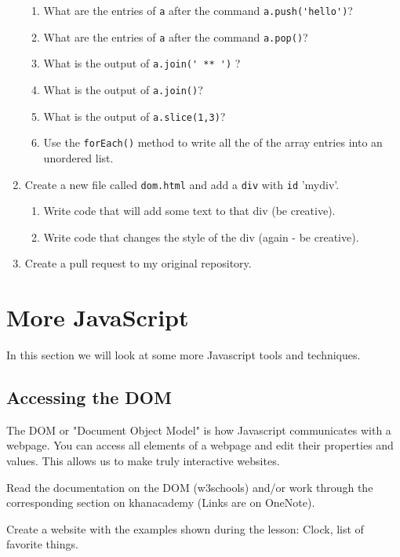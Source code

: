 \documentclass[english,11pt,a4paper]{report}
\begin{document}
\begin{ex}
\begin{enumerate}
\begin{enumerate}
\item What are the entries of \verb|a| after the command \verb|a.push('hello')|?
\item What are the entries of \verb|a| after the command \verb|a.pop()|?
\item What is the output of \verb|a.join(' ** ')| ?
\item What is the output of \verb|a.join()|?
\item What is the output of \verb|a.slice(1,3)|?
\item Use the \verb|forEach()| method to write all the of the array entries into an unordered list.
\end{enumerate}
\item Create a new file called \verb|dom.html| and add a \verb|div| with \verb|id| 'mydiv'.
\begin{enumerate}
\item Write code that will add some text to that div (be creative).
\item Write code that changes the style of the div (again - be creative).
\end{enumerate}
\item Create a pull request to my original repository.
\end{enumerate}
\end{ex}

\newpage


\section{More JavaScript}
In this section we will look at some more Javascript tools and techniques.

\subsection{Accessing the DOM}

The DOM or "Document Object Model" is how Javascript communicates with a webpage.  You can access all elements of a webpage and edit their properties and values. This allows us to make truly interactive websites.

\begin{ex}
Read the documentation on the DOM (w3schools) and/or work through the corresponding section on khanacademy (Links are on OneNote).
\end{ex}

\begin{ex}
Create a website with the examples shown during the lesson: Clock, list of favorite things.
\end{ex}
\end{document}
